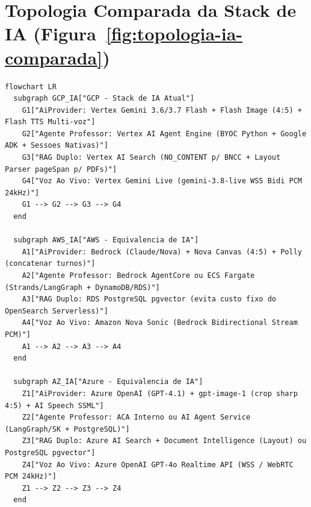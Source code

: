\section{Topologia Comparada da Stack de IA (Figura~\ref{fig:topologia-ia-comparada})}

\begin{lstlisting}[language=mermaid]
flowchart LR
  subgraph GCP_IA["GCP - Stack de IA Atual"]
    G1["AiProvider: Vertex Gemini 3.6/3.7 Flash + Flash Image (4:5) + Flash TTS Multi-voz"]
    G2["Agente Professor: Vertex AI Agent Engine (BYOC Python + Google ADK + Sessoes Nativas)"]
    G3["RAG Duplo: Vertex AI Search (NO_CONTENT p/ BNCC + Layout Parser pageSpan p/ PDFs)"]
    G4["Voz Ao Vivo: Vertex Gemini Live (gemini-3.8-live WSS Bidi PCM 24kHz)"]
    G1 --> G2 --> G3 --> G4
  end

  subgraph AWS_IA["AWS - Equivalencia de IA"]
    A1["AiProvider: Bedrock (Claude/Nova) + Nova Canvas (4:5) + Polly (concatenar turnos)"]
    A2["Agente Professor: Bedrock AgentCore ou ECS Fargate (Strands/LangGraph + DynamoDB/RDS)"]
    A3["RAG Duplo: RDS PostgreSQL pgvector (evita custo fixo do OpenSearch Serverless)"]
    A4["Voz Ao Vivo: Amazon Nova Sonic (Bedrock Bidirectional Stream PCM)"]
    A1 --> A2 --> A3 --> A4
  end

  subgraph AZ_IA["Azure - Equivalencia de IA"]
    Z1["AiProvider: Azure OpenAI (GPT-4.1) + gpt-image-1 (crop sharp 4:5) + AI Speech SSML"]
    Z2["Agente Professor: ACA Interno ou AI Agent Service (LangGraph/SK + PostgreSQL)"]
    Z3["RAG Duplo: Azure AI Search + Document Intelligence (Layout) ou PostgreSQL pgvector"]
    Z4["Voz Ao Vivo: Azure OpenAI GPT-4o Realtime API (WSS / WebRTC PCM 24kHz)"]
    Z1 --> Z2 --> Z3 --> Z4
  end
\end{lstlisting}
